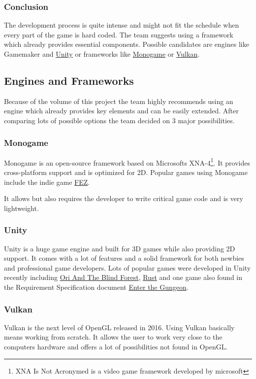\documentclass[11pt]{article}
\begin{document}
\subsubsection{Conclusion}
The development process is quite intense and might not fit the schedule when every part of the game is hard coded. The team suggests using a framework which already provides essential components.
Possible candidates are engines like Gamemaker and \hyperref[subsubsec:unity]{Unity} or frameworks like \hyperref[subsubsec:monogame]{Monogame} or \hyperref[subsubsec:vulkan]{Vulkan}.

\subsection{Engines and Frameworks}
Because of the volume of this project the team highly recommends using an engine which already provides key elements and can be easily extended.
After comparing lots of possible options the team decided on 3 major possibilities.

\subsubsection{Monogame}\label{subsubsec:monogame}
Monogame is an open-source framework based on Microsofts XNA-4\footnote{XNA Is Not Acronymed is a video game framework developed by microsoft}. It provides cross-platform support and is optimized for 2D.
Popular games using Monogame include the indie game \href{http://store.steampowered.com/app/224760/}{FEZ}.

It allows but also requires the developer to write critical game code and is very lightweight.
\subsubsection{Unity}\label{subsubsec:unity}
Unity is a huge game engine and built for 3D games while also providing 2D support. It comes with a lot of features and a solid framework for both newbies and professional game developers.
Lots of popular games were developed in Unity recently including \href{http://www.oriblindforest.com}{Ori And The Blind Forest}, \href{https://playrust.com}{Rust} and one game also found in the Requirement Specification document \href{http://dodgeroll.com/gungeon/}{Enter the Gungeon}.
\subsubsection{Vulkan}\label{subsubsec:vulkan}
Vulkan is the next level of OpenGL released in 2016. Using Vulkan basically means working from scratch. It allows the user to work very close to the computers hardware and offers a lot of possibilities not found in OpenGL.
\end{document}
